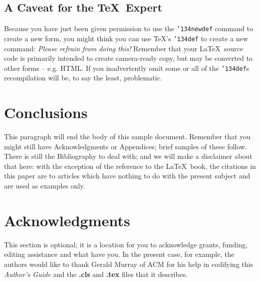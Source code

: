 \documentclass{acm_proc_article-sp}
\begin{document}
\subsection*{A {\secit Caveat} for the \TeX\ Expert}
Because you have just been given permission to
use the \texttt{{\char'134}newdef} command to create a
new form, you might think you can
use \TeX's \texttt{{\char'134}def} to create a
new command: \textit{Please refrain from doing this!}
Remember that your \LaTeX\ source code is primarily intended
to create camera-ready copy, but may be converted
to other forms -- e.g. HTML. If you inadvertently omit
some or all of the \texttt{{\char'134}def}s recompilation will
be, to say the least, problematic.

\section{Conclusions}
This paragraph will end the body of this sample document.
Remember that you might still have Acknowledgments or
Appendices; brief samples of these
follow.  There is still the Bibliography to deal with; and
we will make a disclaimer about that here: with the exception
of the reference to the \LaTeX\ book, the citations in
this paper are to articles which have nothing to
do with the present subject and are used as
examples only.

\section{Acknowledgments}
This section is optional; it is a location for you
to acknowledge grants, funding, editing assistance and
what have you.  In the present case, for example, the
authors would like to thank Gerald Murray of ACM for
his help in codifying this \textit{Author's Guide}
and the \textbf{.cls} and \textbf{.tex} files that it describes.

%

%
%
\end{document}
